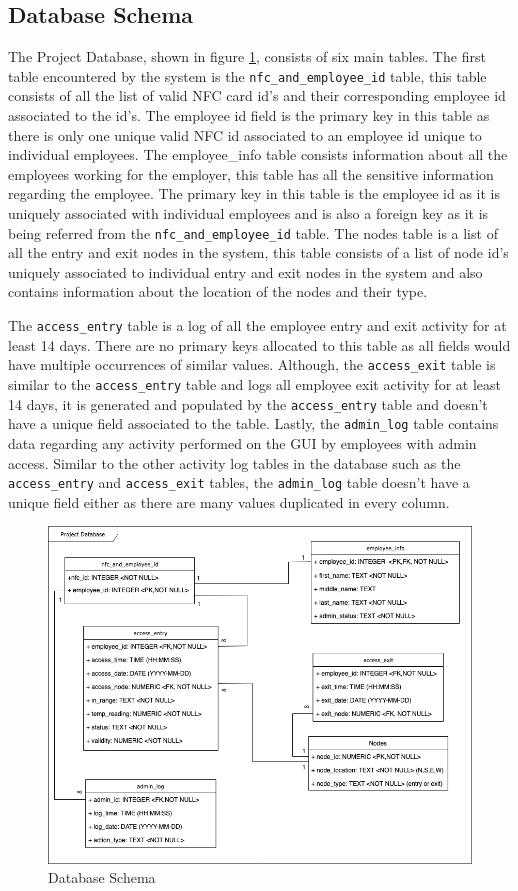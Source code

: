 \subsection{Database Schema}

The Project Database, shown in figure \ref{fig:db-schema}, consists of six main
tables. The first table encountered by the system is the \verb|nfc_and_employee_id|
table, this table consists of all the list of valid NFC card id’s and their
corresponding employee id associated to the id’s. The employee id field is the
primary key in this table as there is only one unique valid NFC id associated to
an employee id unique to individual employees. The employee\_info table consists
information about all the employees working for the employer, this table has all
the sensitive information regarding the employee. The primary key in this table
is the employee id as it is uniquely associated with individual employees and is
also a foreign key as it is being referred from the \verb|nfc_and_employee_id|
table. The nodes table is a list of all the entry and exit nodes in the system,
this table consists of a list of node id’s uniquely associated to individual
entry and exit nodes in the system and also contains information about the
location of the nodes and their type. 

The \verb|access_entry| table is a log of all the employee entry and exit
activity for at least 14 days. There are no primary keys allocated to this
table as all fields would have multiple occurrences of similar
values. Although, the \verb|access_exit| table is similar to the
\verb|access_entry| table and logs all employee exit activity for at least 14
days, it is generated and populated by the \verb|access_entry| table and
doesn’t have a unique field associated to the table.  Lastly, the
\verb|admin_log| table contains data regarding any activity performed on the
GUI by employees with admin access. Similar to the other activity log tables in
the database such as the \verb|access_entry| and \verb|access_exit| tables, the
\verb|admin_log| table doesn’t have a unique field either as there are many
values duplicated in every column.

\begin{figure}[!htb]
\centering
\includegraphics[width=\textwidth]{images/db-schema.png}
\caption{Database Schema}
\label{fig:db-schema}
\end{figure}

